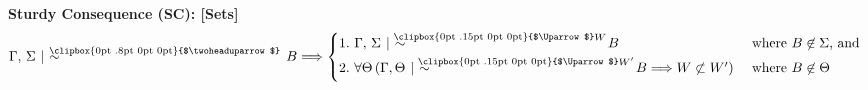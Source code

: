 \documentclass{article}                     %
\makeatletter
\theoremstyle{definition}
\newcommand{\Uuparrow}{%
	\raisebox{.2ex}{\clipbox{0pt .15pt 0pt 0pt}{$\Uparrow$}}
}
\newcommand{\thuarrow}{%
	\raisebox{.05ex}{\clipbox{0pt .8pt 0pt 0pt}{$\twoheaduparrow$}}
}
\newcommand{\nms}{%
	\mathbin{\mathpalette\@nms\expandafter}
}
\newcommand{\@nms}{\mid\joinrel\mkern-.5mu\sim}
\newcommand{\mrc}[1]{\mathbin{
		\mathchoice
		{\normalsize\hspace{.5mm}\nms^{\mkern-19mu\scriptsize\Uuparrow#1}\hspace{-.5mm}}
		{\normalsize\hspace{.5mm}\nms^{\mkern-19mu\scriptsize\Uuparrow#1}\hspace{-.5mm}}
		{\footnotesize\hspace{.5mm}\nms^{\mkern-13.5mu\fontsize{5.5}{0}\Uuparrow#1}}
		{\scriptsize\nms^{\mkern-10mu\tiny\Uuparrow#1}}
	}
}
\newcommand{\smc}{\mathbin{
		\mathchoice
		{\hspace{.4mm}\nms^{\mkern-17mu\scriptsize\thuarrow}\hspace{.6mm}}
		{\hspace{.4mm}\nms^{\mkern-17mu\scriptsize\thuarrow}\hspace{.6mm}}
		{\footnotesize\hspace{.4mm}\nms^{\mkern-11mu\tiny\thuarrow}\hspace{.6mm}}
		{\scriptsize\nms^{\mkern-10mu\tiny\thuarrow}}
	}
}
\makeatother
\begin{document}
\noindent\textbf{Sturdy  Consequence (SC): [Sets]}\label{SCset}
\begin{equation}
\Gamma, \, \Sigma \smc B \Longrightarrow
\begin{cases}\nonumber 
1.\,\, \Gamma, \, \Sigma \mrc{W} B & $ where $ B \not\in \Sigma $, and $ \\[3pt] 
2.\,\, \forall \Theta\,(\Gamma, \Theta \mrc{W'} B \Longrightarrow W\not\subset W' ) & $ where $ B\not\in \Theta  \\[3pt] 
\end{cases}
\end{equation}







\printbibliography
\end{document}
